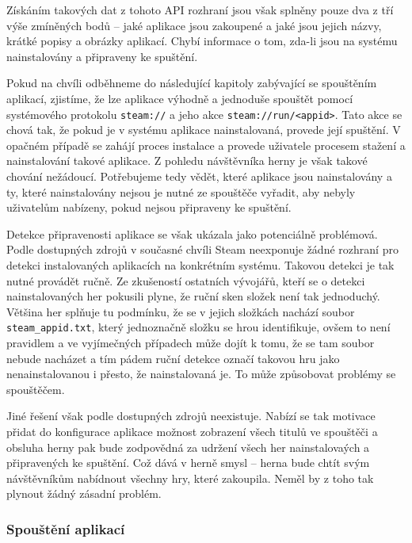 Získáním takových dat z tohoto API rozhraní jsou však splněny pouze dva
z tří výše zmíněných bodů -- jaké aplikace jsou zakoupené a jaké jsou
jejich názvy, krátké popisy a obrázky aplikací. Chybí informace o tom,
zda-li jsou na systému nainstalovány a připraveny ke spuštění.

Pokud na chvíli odběhneme do následující kapitoly zabývající se
spouštěním aplikací, zjistíme, že lze aplikace výhodně a jednoduše
spouštět pomocí systémového protokolu \texttt{steam://} a jeho akce
\texttt{steam://run/\textless{}appid\textgreater{}}. Tato akce se chová
tak, že pokud je v systému aplikace nainstalovaná, provede její
spuštění. V opačném případě se zahájí proces instalace a provede
uživatele procesem stažení a nainstalování takové aplikace. Z pohledu
návštěvníka herny je však takové chování nežádoucí. Potřebujeme tedy
vědět, které aplikace jsou nainstalovány a ty, které nainstalovány
nejsou je nutné ze spouštěče vyřadit, aby nebyly uživatelům nabízeny,
pokud nejsou připraveny ke spuštění.

Detekce připravenosti aplikace se však ukázala jako potenciálně
problémová. Podle dostupných zdrojů v současné chvíli Steam neexponuje
žádné rozhraní pro detekci instalovaných aplikacích na konkrétním
systému. Takovou detekci je tak nutné provádět ručně. Ze zkušeností
ostatních vývojářů, kteří se o detekci nainstalovaných her pokusili
plyne, že ruční sken složek není tak jednoduchý. Většina her splňuje tu
podmínku, že se v jejich složkách nachází soubor
\texttt{steam\_appid.txt}, který jednoznačně složku se hrou
identifikuje, ovšem to není pravidlem a ve vyjímečných případech může
dojít k tomu, že se tam soubor nebude nacházet a tím pádem ruční detekce
označí takovou hru jako nenainstalovanou i přesto, že nainstalovaná je.
To může způsobovat problémy se spouštěčem.

Jiné řešení však podle dostupných zdrojů neexistuje. Nabízí se tak
motivace přidat do konfigurace aplikace možnost zobrazení všech titulů
ve spouštěči a obsluha herny pak bude zodpovědná za udržení všech her
nainstalovaých a připravených ke spuštění. Což dává v herně smysl --
herna bude chtít svým návštěvníkům nabídnout všechny hry, které
zakoupila. Neměl by z toho tak plynout žádný zásadní problém.

\subsubsection{Spouštění
aplikací}\label{spouux161tux11bnuxed-aplikacuxed}


